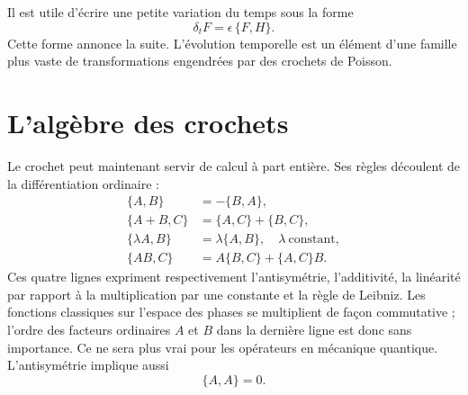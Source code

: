 \begin{classroomqa}
\end{classroomqa}

Il est utile d’écrire une petite variation du temps sous la forme
\begin{equation}
  \delta_t F=\epsilon\,\{F,H\}.
  \label{eq:l8-small-time-step}
\end{equation}
Cette forme annonce la suite. L’évolution temporelle est un élément d’une famille plus vaste de transformations engendrées par des crochets de Poisson.

\section{L’algèbre des crochets}

Le crochet peut maintenant servir de calcul à part entière. Ses règles découlent de la différentiation ordinaire :
\begin{align}
  \{A,B\}&=-\{B,A\}, \label{eq:l8-antisymmetry}\\
  \{A+B,C\}&=\{A,C\}+\{B,C\}, \label{eq:l8-additivity}\\
  \{\lambda A,B\}&=\lambda\{A,B\},
    \quad \lambda\ \text{constant}, \label{eq:l8-scalar-rule}\\
  \{AB,C\}&=A\{B,C\}+\{A,C\}B. \label{eq:l8-leibniz}
\end{align}
Ces quatre lignes expriment respectivement l’antisymétrie, l’additivité, la linéarité par rapport à la multiplication par une constante et la règle de Leibniz.
Les fonctions classiques sur l’espace des phases se multiplient de façon commutative ; l’ordre des facteurs ordinaires \(A\) et \(B\) dans la dernière ligne est donc sans importance. Ce ne sera plus vrai pour les opérateurs en mécanique quantique. L’antisymétrie implique aussi
\begin{equation}
  \{A,A\}=0.
  \label{eq:l8-self-bracket}
\end{equation}


